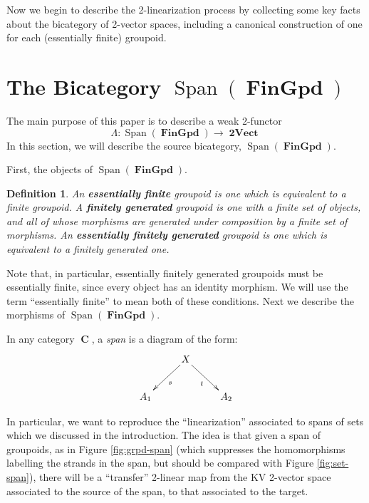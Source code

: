 \documentclass[10pt]{amsart}
\numberwithin{theorem}{subsection}
\newtheorem{definition}[theorem]{Definition}
\newcommand{\ra}{\mathop{\rightarrow}}
\newcommand{\opname}[1]{\operatorname{#1}}
\newcommand{\catname}[1]{\boldsymbol{\opname{{#1}}}}
\newcommand{\C}{\catname{C}}
\newcommand{\Span}{\opname{Span}}
\newcommand{\iiV}{\catname{2Vect}}
\newcommand{\Gpd}{\catname{FinGpd}}
\newcommand{\FV}{\Lambda}
\begin{document}
Now we begin to describe the 2-linearization process by collecting
some key facts about the bicategory of 2-vector spaces, including a
canonical construction of one for each (essentially finite) groupoid.

\section{The Bicategory $\Span(\Gpd)$}\label{sec:spangpd}

The main purpose of this paper is to describe a weak 2-functor
\begin{equation}
\FV : \Span(\Gpd) \ra \iiV
\end{equation}
In this section, we will describe the source bicategory, $\Span(\Gpd)$.

First, the objects of $\Span(\Gpd)$.

\begin{definition}\label{def:essfingpd} An \textbf{essentially finite}
groupoid is one which is equivalent to a finite groupoid.  A
\textbf{finitely generated} groupoid is one with a finite set of
objects, and all of whose morphisms are generated under composition by
a finite set of morphisms.  An \textbf{essentially finitely generated}
groupoid is one which is equivalent to a finitely generated one.
\end{definition}

Note that, in particular, essentially finitely generated groupoids must be essentially finite, since every object has an identity morphism.  We will use the term ``essentially finite'' to mean both of these conditions.  Next we describe the morphisms of $\Span(\Gpd)$.

In any category $\C$, a \textit{span} is a diagram of the form:
\begin{equation}\label{eq:spandiag}
\xymatrix{
  & X \ar[dl]^{s} \ar[dr]_{t} & \\
A_1  & & A_2  \\
}
\end{equation}

In particular, we want to reproduce the ``linearization'' associated
to spans of sets which we discussed in the introduction.  The idea is
that given a span of groupoids, as in Figure \ref{fig:grpd-span}
(which suppresses the homomorphisms labelling the strands in the span,
but should be compared with Figure \ref{fig:set-span}), there will be
a ``transfer'' 2-linear map from the KV 2-vector space associated to
the source of the span, to that associated to the target.
\end{document}
